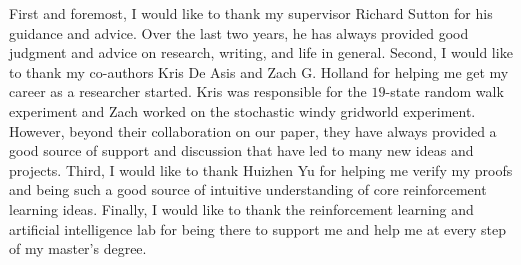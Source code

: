 \providecommand{\main}{..}



\begin{acknowledgements} 

First and foremost, I would like to thank my supervisor Richard Sutton for his guidance and advice.
Over the last two years, he has always provided good judgment and advice on research, writing, and life in general.
Second, I would like to thank my co-authors Kris De Asis and Zach G. Holland for helping me get my career as a researcher started.
Kris was responsible for the $19$-state random walk experiment and Zach worked on the stochastic windy gridworld experiment.
However, beyond their collaboration on our paper, they have always provided a good source of support and discussion that have led to many new ideas and projects.
Third, I would like to thank Huizhen Yu for helping me verify my proofs and being such a good source of intuitive understanding of core reinforcement learning ideas.
Finally, I would like to thank the reinforcement learning and artificial intelligence lab for being there to support me and help me at every step of my master's degree.

\end{acknowledgements}

